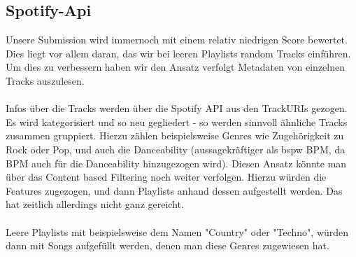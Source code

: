 \documentclass[12pt]{article}
\begin{document}
\subsection{Spotify-Api}
\label{SpoitfyApi}
Unsere Submission wird immernoch mit einem relativ niedrigen Score bewertet. Dies liegt vor allem daran, das wir bei leeren Playlists random Tracks einführen. Um dies zu verbessern haben wir den Ansatz verfolgt Metadaten von einzelnen Tracks auszulesen. \\\\
Infos über die Tracks werden über die Spotify API aus den TrackURIs gezogen. Es wird kategorisiert und so neu gegliedert - so werden sinnvoll ähnliche Tracks zusammen gruppiert. Hierzu zählen beispielsweise Genres wie Zugehörigkeit zu Rock oder Pop, und auch die Danceability (aussagekräftiger als bspw BPM, da BPM auch für die Danceability hinzugezogen wird). Diesen Ansatz könnte man über das Content based Filtering noch weiter verfolgen. Hierzu würden die Features zugezogen, und dann Playlists anhand dessen aufgestellt werden. Das hat zeitlich allerdings nicht ganz gereicht.
\\\\
Leere Playlists mit beispielsweise dem Namen "Country" oder "Techno", würden dann mit Songs aufgefüllt werden, denen man diese Genres zugewiesen hat.
\end{document}
